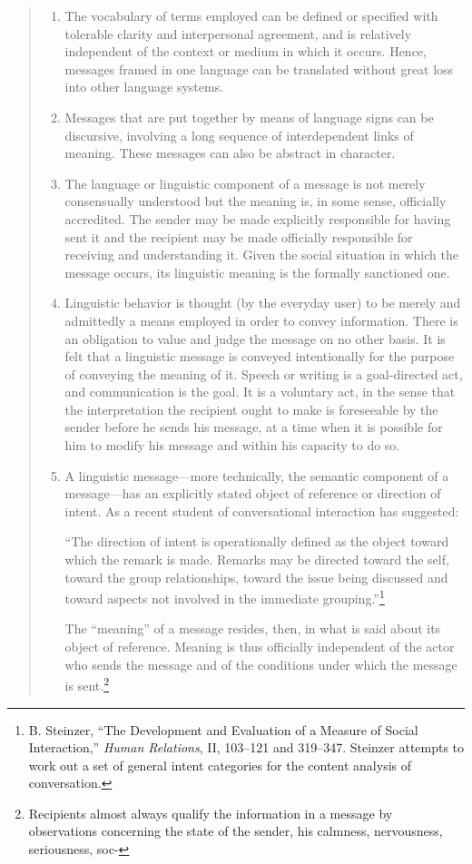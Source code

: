 \documentclass[twoside,symmetric,nobib,justified]{tufte-book}
\begin{document}
\begin{quote}
\begin{enumerate}
\item
  The vocabulary of terms employed can be defined or specified with
  tolerable clarity and interpersonal agreement, and is relatively
  independent of the context or medium in which it occurs. Hence,
  messages framed in one language can be translated without great loss
  into other language systems.
\item
  Messages that are put together by means of language signs can be
  discursive, involving a long sequence of interdependent links of
  meaning. These messages can also be abstract in character.
\item
  The language or linguistic component of a message is not merely
  consensually understood but the meaning is, in some sense, officially
  accredited. The sender may be made explicitly responsible for having
  sent it and the recipient may be made officially responsible for
  receiving and understanding it. Given the social situation in which
  the message occurs, its linguistic meaning is the formally sanctioned
  one.
\item
  Linguistic behavior is thought (by the everyday user) to be merely and
  admittedly a means employed in order to convey information. There is
  an obligation to value and judge the message on no other basis. It is
  felt that a linguistic message is conveyed intentionally for the
  purpose of conveying the meaning of it. Speech or writing is a
  goal-directed act, and communication is the goal. It is a voluntary
  act, in the sense that the interpretation the recipient ought to make
  is foreseeable by the sender before he sends his message, at a time
  when it is possible for him to modify his message and within his
  capacity to do so.
\item
  A linguistic message---more technically, the semantic component of a
  message---has an explicitly stated object of reference or direction of
  intent. As a recent student of conversational interaction has
  suggested:

  ``The direction of intent is operationally defined as the object
  toward which the remark is made. Remarks may be directed toward the
  self, toward the group relationships, toward the issue being discussed
  and toward aspects not involved in the immediate
  grouping.''\footnote{B. Steinzer, ``The Development and Evaluation of
    a Measure of Social Interaction,'' \emph{Human Relations}, II,
    103--121 and 319--347. Steinzer attempts to work out a set of
    general intent categories for the content analysis of conversation.}

  The ``meaning'' of a message resides, then, in what is said about its
  object of reference. Meaning is thus officially independent of the
  actor who sends the message and of the conditions under which the
  message is sent.\footnote{Recipients almost always qualify the
    information in a message by observations concerning the state of the
    sender, his calmness, nervousness, seriousness, soc-}
\end{enumerate}
\end{quote}
\end{document}
